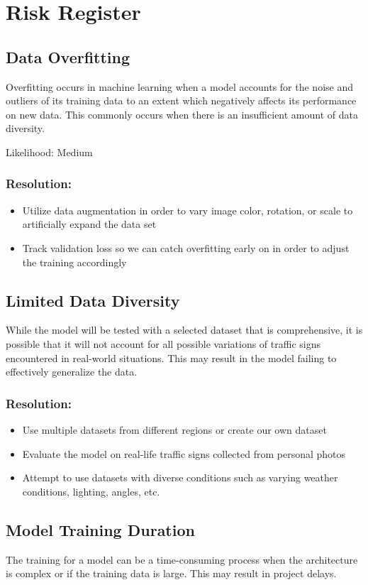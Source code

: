 \documentclass{article} %
\begin{document}
\section{Risk Register}
\subsection{Data Overfitting}
Overfitting occurs in machine learning when a model accounts for the noise and outliers of its training data to an extent which negatively affects its performance on new data. This commonly occurs when there is an insufficient amount of data diversity. 

Likelihood: Medium

\subsubsection{Resolution:}
\begin{itemize}
    \item Utilize data augmentation in order to vary image color, rotation, or scale to artificially expand the data set 
    \item Track validation loss so we can catch overfitting early on in order to adjust the training accordingly 
\end{itemize}
\subsection{Limited Data Diversity}
While the model will be tested with a selected dataset that is comprehensive, it is possible that it will not account for all possible variations of traffic signs encountered in real-world situations. This may result in the model failing to effectively generalize the data.  
\subsubsection{Resolution:}
\begin{itemize}
    \item Use multiple datasets from different regions or create our own dataset
    \item Evaluate the model on real-life traffic signs collected from personal photos
    \item Attempt to use datasets with diverse conditions such as varying weather conditions, lighting, angles, etc.
\end{itemize}

\subsection{Model Training Duration}
The training for a model can be a time-consuming process when the architecture is complex or if the training data is large. This may result in project delays. 
\end{document}
